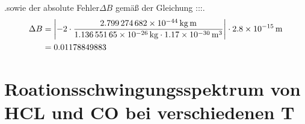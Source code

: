 .sowie der absolute Fehler$\Delta B$ gemäß der  Gleichung  :::.  
\begin{align}
\Delta B &= \left|-2\cdot \frac{\SI[mode=math]{2.799274682e-44}{kg.m}}{\SI[mode=math]{1.13655165e-26}{kg}\cdot\SI[mode=math]{1.17e-30}{m^{3}}}\right| \cdot \SI[mode=math]{2.8e-15}{m}
\notag\\
&=0.01178849883\label{eq:DeltaB_CO}
\end{align} 









 

\section{Roationsschwingungsspektrum von HCL und CO bei verschiedenen T}

